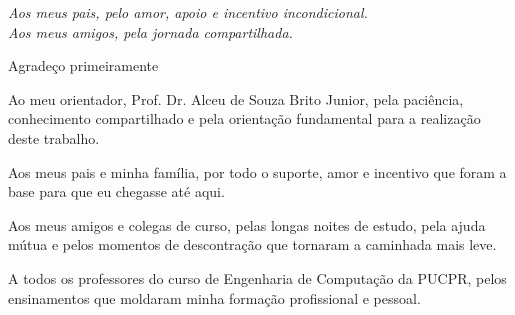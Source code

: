 \documentclass[
	a4paper,      %
	12pt,         %
	english,      %
	oneside,      %
	openany       %
]{abntex2}
\begin{document}


\imprimircapa

\imprimirfolhaderosto

\begin{dedicatoria}
	\vspace*{\fill} %
	\begin{flushright} %
		\textit{Aos meus pais, pelo amor, apoio e incentivo incondicional.\\
		Aos meus amigos, pela jornada compartilhada.}
	\end{flushright}
\end{dedicatoria}

\begin{agradecimentos}
	Agradeço primeiramente 

	Ao meu orientador, Prof. Dr. Alceu de Souza Brito Junior, pela paciência, conhecimento compartilhado e pela orientação fundamental para a realização deste trabalho.
	
	Aos meus pais e minha família, por todo o suporte, amor e incentivo que foram a base para que eu chegasse até aqui.
	
	Aos meus amigos e colegas de curso, pelas longas noites de estudo, pela ajuda mútua e pelos momentos de descontração que tornaram a caminhada mais leve.
	
	A todos os professores do curso de Engenharia de Computação da PUCPR, pelos ensinamentos que moldaram minha formação profissional e pessoal.

\end{agradecimentos}
\end{document}
